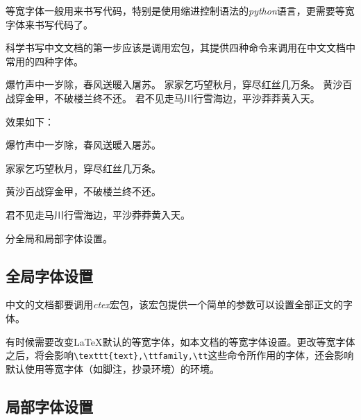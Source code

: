 等宽字体一般用来书写代码，特别是使用缩进控制语法的\emph{python}语言，更需要等宽字体来书写代码了。

科学书写中文文档的第一步应该是调用\CTeX 宏包，其提供四种命令来调用在中文文档中常用的四种字体。

\begin{latex}{}
{\songti 爆竹声中一岁除，春风送暖入屠苏。}
{\fangsong 家家乞巧望秋月，穿尽红丝几万条。}
{\heiti 黄沙百战穿金甲，不破楼兰终不还。}
{\kaishu 君不见走马川行雪海边，平沙莽莽黄入天。}
\end{latex}

效果如下：

\begin{center}
	{\songti 爆竹声中一岁除，春风送暖入屠苏。}\par
	{\fangsong 家家乞巧望秋月，穿尽红丝几万条。}\par
	{\heiti 黄沙百战穿金甲，不破楼兰终不还。}\par
	{\kaishu 君不见走马川行雪海边，平沙莽莽黄入天。}
\end{center}

分全局和局部字体设置。
\subsection{全局字体设置}
中文的文档都要调用\emph{ctex}宏包，该宏包提供一个简单的参数可以设置全部正文的字体。

\begin{latex}{}
\setmainfont{Times New Roman}	%
\end{latex}

有时候需要改变\LaTeX 默认的等宽字体，如本文档的等宽字体设置。更改等宽字体之后，将会影响\verb|\texttt{text},\ttfamily,\tt|这些命令所作用的字体，还会影响默认使用等宽字体（如脚注，抄录环境）的环境。

\begin{latex}{}
\setmonofont{Source Code Pro}	%
\end{latex}

\subsection{局部字体设置}

\begin{latex}{}
\newfontfamily{}	%
\end{latex}

